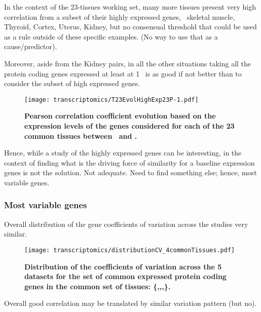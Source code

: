 In the context of the 23-tissues working set,
many more tissues present very high correlation from a subset of their highly
expressed genes, \ie\ skeletal muscle, Thyroid, Cortex, Uterus, Kidney, but
no consensual threshold that could be used as a rule outside of these specific
examples. (No way to use that as a cause/predictor).

Moreover, aside from the Kidney pairs, in all the other situations taking all the
protein coding genes expressed at least at  1 \FPKM\ is as good if not better than
to consider the subset of high expressed genes.

\begin{figure}[htpb]
    \texttt{[image: transcriptomics/T23EvolHighExp23P-1.pdf]}\centering
    \caption[Pearson correlation coefficient evolution based on the expression
    levels of the genes considered for each of the 23 common tissues]{%
\label{fig:CorHighExp23T}\textbf{Pearson correlation coefficient evolution based
on the expression levels of the genes considered
for each of the 23 common tissues between \uhlen\ and \gtex.}}
\end{figure}


Hence, while a study of the highly expressed genes can be interesting, in
the context of finding what is the driving force of similarity for a baseline
expression genes is not the solution. Not adequate.
Need to find something else; hence, most variable genes.



\subsubsection{Most variable genes}

Overall distribution of the gene coefficients of variation across the studies
very similar.

\begin{figure}[htpb]
    \texttt{[image: transcriptomics/distributionCV\_4commonTissues.pdf]}%
    \centering
    \caption[Coefficient of variation across the datasets for the set of common
expressed genes]{\label{fig:HistCV4T}\textbf{Distribution of the coefficients of
variation across the 5 datasets for the set of common expressed protein coding
genes in the common set of tissues:
\{,,,\}.}}
\end{figure}


Overall good correlation may be translated by similar variation pattern (but no).

